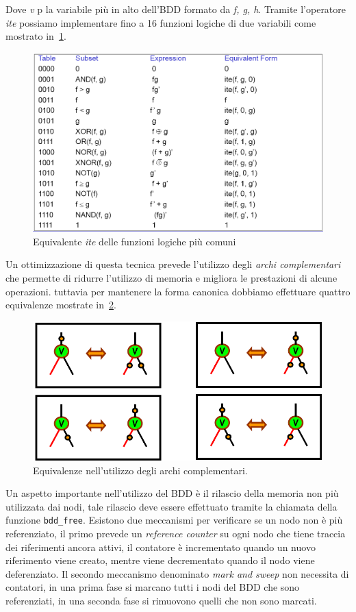 Dove \emph{v} p la variabile più in alto dell'BDD formato da \emph{f, g, h}.
Tramite l'operatore \emph{ite} possiamo implementare fino a 16 funzioni logiche di due variabili come mostrato in \figurename\,\ref{fig:itefun}.\\
\begin{figure}
\centering
\includegraphics[scale=0.5]{img/itefun.png}
\caption{Equivalente \emph{ite} delle funzioni logiche più comuni}\label{fig:itefun}
\end{figure}
Un ottimizzazione di questa tecnica prevede l'utilizzo degli \emph{archi complementari} che permette di ridurre l'utilizzo di memoria e migliora le prestazioni di alcune operazioni.
tuttavia per mantenere la forma canonica dobbiamo effettuare quattro equivalenze mostrate in \figurename\,\ref{fig:complementedge}.\\
\begin{figure}
\centering
\includegraphics[scale=0.5]{img/complementedge.png}
\caption{Equivalenze nell'utilizzo degli archi complementari.}\label{fig:complementedge}
\end{figure}
Un aspetto importante nell'utilizzo del BDD è il rilascio della memoria non più utilizzata dai nodi, tale rilascio deve essere effettuato tramite la chiamata della funzione \texttt{bdd\_free}. Esistono due meccanismi per verificare se un nodo non è più referenziato, il primo prevede un \emph{reference counter} su ogni nodo che tiene traccia dei riferimenti ancora attivi, il contatore è incrementato quando un nuovo riferimento viene creato, mentre viene decrementato quando il nodo viene deferenziato. Il secondo meccanismo denominato \emph{mark and sweep} non necessita di contatori, in una prima fase si marcano tutti i nodi del BDD che sono referenziati, in una seconda fase si rimuovono quelli che non sono marcati.\\
